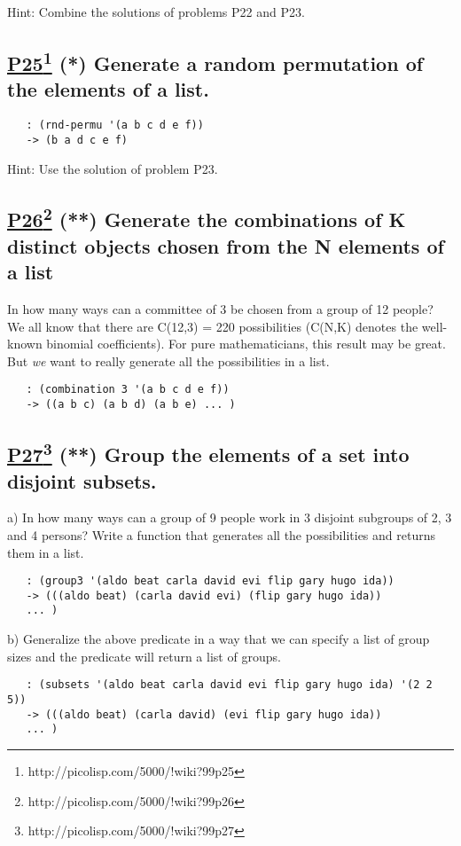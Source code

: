 \documentclass[10pt,a4paper]{article}
\begin{document}
Hint: Combine the solutions of problems P22 and P23.

\subsection*{\underline{P25}\footnote{http://picolisp.com/5000/!wiki?99p25} (*) Generate a random permutation of the elements of a list.}
\begin{verbatim}
   : (rnd-permu '(a b c d e f))
   -> (b a d c e f)
\end{verbatim}

Hint: Use the solution of problem P23.

\subsection*{\underline{P26}\footnote{http://picolisp.com/5000/!wiki?99p26} (**) Generate the combinations of K distinct objects
chosen from the N elements of a list}
In how many ways can a committee of 3 be chosen from a group of
12 people? We all know that there are C(12,3) = 220 possibilities
(C(N,K) denotes the well-known binomial coefficients). For pure
mathematicians, this result may be great. But \textit{we} want to
really generate all the possibilities in a list.
\begin{verbatim}
   : (combination 3 '(a b c d e f))
   -> ((a b c) (a b d) (a b e) ... )
\end{verbatim}


\subsection*{\underline{P27}\footnote{http://picolisp.com/5000/!wiki?99p27} (**) Group the elements of a set into disjoint subsets.}
a) In how many ways can a group of 9 people work in 3 disjoint subgroups
of 2, 3 and 4 persons? Write a function that generates all the
possibilities and returns them in a list.
\begin{verbatim}
   : (group3 '(aldo beat carla david evi flip gary hugo ida))
   -> (((aldo beat) (carla david evi) (flip gary hugo ida))
   ... )
\end{verbatim}

b) Generalize the above predicate in a way that we can specify a list
of group sizes and the predicate will return a list of groups.
\begin{verbatim}
   : (subsets '(aldo beat carla david evi flip gary hugo ida) '(2 2 5))
   -> (((aldo beat) (carla david) (evi flip gary hugo ida))
   ... )
\end{verbatim}
\end{document}
